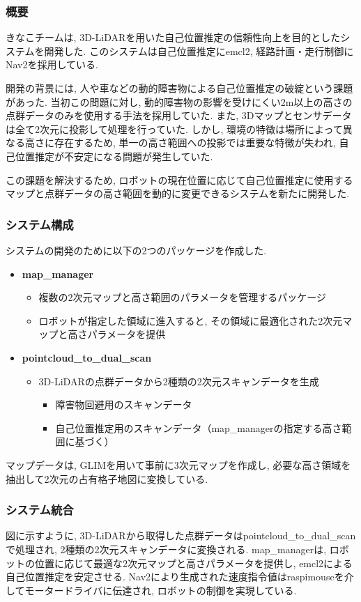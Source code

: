 \subsubsection{概要}
きなこチームは, 3D-LiDARを用いた自己位置推定の信頼性向上を目的としたシステムを開発した. 
このシステムは自己位置推定にemcl2, 経路計画・走行制御にNav2を採用している. 

開発の背景には, 人や車などの動的障害物による自己位置推定の破綻という課題があった. 
当初この問題に対し, 動的障害物の影響を受けにくい2m以上の高さの点群データのみを使用する手法を採用していた. 
また, 3Dマップとセンサデータは全て2次元に投影して処理を行っていた. 
しかし, 環境の特徴は場所によって異なる高さに存在するため, 単一の高さ範囲への投影では重要な特徴が失われ, 自己位置推定が不安定になる問題が発生していた. 

この課題を解決するため, ロボットの現在位置に応じて自己位置推定に使用するマップと点群データの高さ範囲を動的に変更できるシステムを新たに開発した. 

\subsubsection{システム構成}
システムの開発のために以下の2つのパッケージを作成した. 

\begin{itemize}
  \item \textbf{map\_manager}
    \begin{itemize}
      \item 複数の2次元マップと高さ範囲のパラメータを管理するパッケージ
      \item ロボットが指定した領域に進入すると, その領域に最適化された2次元マップと高さパラメータを提供
    \end{itemize}
  \item \textbf{pointcloud\_to\_dual\_scan}
    \begin{itemize}
      \item 3D-LiDARの点群データから2種類の2次元スキャンデータを生成
        \begin{itemize}
          \item 障害物回避用のスキャンデータ
          \item 自己位置推定用のスキャンデータ（map\_managerの指定する高さ範囲に基づく）
        \end{itemize}
    \end{itemize}
\end{itemize}

マップデータは, GLIMを用いて事前に3次元マップを作成し, 必要な高さ領域を抽出して2次元の占有格子地図に変換している. 


\subsubsection{システム統合}
図に示すように, 3D-LiDARから取得した点群データはpointcloud\_to\_dual\_scanで処理され, 2種類の2次元スキャンデータに変換される. 
map\_managerは, ロボットの位置に応じて最適な2次元マップと高さパラメータを提供し, emcl2による自己位置推定を安定させる. 
Nav2により生成された速度指令値はraspimouseを介してモータードライバに伝達され, ロボットの制御を実現している. 